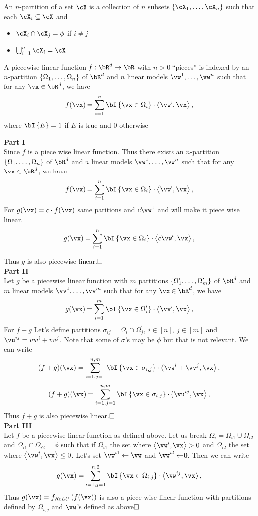 \documentclass[a4paper,11pt]{article}
\begin{document}
\begin{mlsolution}
An $n$-partition of a set $\cX$ is a collection of $n$ subsets $\bc{\cX_1,\ldots,\cX_n}$ such that each $\cX_i \subseteq \cX$ and
\begin{itemize}
	\item $\cX_i \cap \cX_j = \phi$ if $i \neq j$
	\item $\bigcup_{i=1}^n \cX_i = \cX$
\end{itemize}
 A piecewise linear function $f: \bR^d \rightarrow \bR$ with $n > 0$ ``pieces'' is indexed by an $n$-partition $\left\{{\Omega_1,\ldots,\Omega_n}\right\}$ of $\bR^d$ and $n$ linear models $\vw^1,\ldots,\vw^n$ such that for any $\vx \in \bR^d$, we have
\[
f(\vx) = \sum_{i=1}^n \ind{\vx \in \Omega_i}\cdot\ip{\vw^i}{\vx},
\]
where $\ind{E} = 1$ if $E$ is true and $0$ otherwise

\textbf{Part I}\\
Since $f$ is a piece wise linear function. Thus there exists an $n$-partition $\left\{{\Omega_1,\ldots,\Omega_n}\right\}$ of $\bR^d$ and $n$ linear models $\vw^1,\ldots,\vw^n$ such that for any $\vx \in \bR^d$, we have
\[
f(\vx) = \sum_{i=1}^n \ind{\vx \in \Omega_i}\cdot\ip{\vw^i}{\vx},
\]
For $g(\vx)=c\cdot f(\vx)$ same paritions and $c\vw^1$ and will make it piece wise linear.
\[
g(\vx) = \sum_{i=1}^n \ind{\vx \in \Omega_i}\cdot\ip{c\vw^i}{\vx},
\]

Thus $g$ is also piecewise linear.$ \hfill \square $\\
\textbf{Part II}\\
Let $g$ be a piecewise linear function with $m$ partitions $\left\{{\Omega_1^\prime,\ldots,\Omega_{m}^\prime}\right\}$ of $\bR^d$  and $m$ linear models $\vv^1,\ldots,\vv^m$ such that for any $\vx \in \bR^d$, we have
\[
g(\vx) = \sum_{i=1}^m \ind{\vx \in \Omega_i^\prime}\cdot\ip{\vv^i}{\vx},
\]
For $f + g$ Let's define partitions $\sigma_{ij} = \Omega_i \cap \Omega_j^\prime, \ i \in [n] ,\ j \in [m] $ and $\vu^{ij} = vw^i + vv^j$. Note that some of $\sigma$'s may be $\phi$ but that is not relevant. We can write
\[
(f+g)(\vx) = \sum_{i=1,j=1}^{n,m} \ind{\vx \in \sigma_{i,j}}\cdot\ip{\vw^i + \vv^j}{\vx},
\]
\[
(f+g)(\vx) = \sum_{i=1,j=1}^{n,m} \ind{\vx \in \sigma_{i,j}}\cdot\ip{\vu^{ij}}{\vx},
\]
Thus $f+g$ is also piecewise linear.$ \hfill \square $\\
\textbf{Part III}\\
Let $f$ be a piecewise linear function as defined above.
Let us break $\Omega_i = \Omega_{i1} \cup \Omega_{i2}$ and $\Omega_{i1} \cap \Omega_{i2} = \phi$ such that
if $\Omega_{i1}$ the set where $\ip{\vw^i}{\vx} > 0$ and $\Omega_{i2}$ the set where $\ip{\vw^i}{\vx} \leq 0$.
Let's set $\vw^{i1} \gets \vw$ and $\vw^{i2} \gets $\textbf{0}.
Then we can write
\[
g(\vx) = \sum_{i=1,j=1}^{n,2} \ind{\vx \in \Omega_{i,j}}\cdot\ip{\vw^{ij}}{\vx},
\]
Thus $g(\vx) = f_{ReLU}\left(f(\vx)\right)$ is also a piece wise linear function with partitions defined by  $\Omega_{i,j}$ and $\vw$'s defined as above$ \hfill \square $\\


\end{mlsolution}
\end{document}
